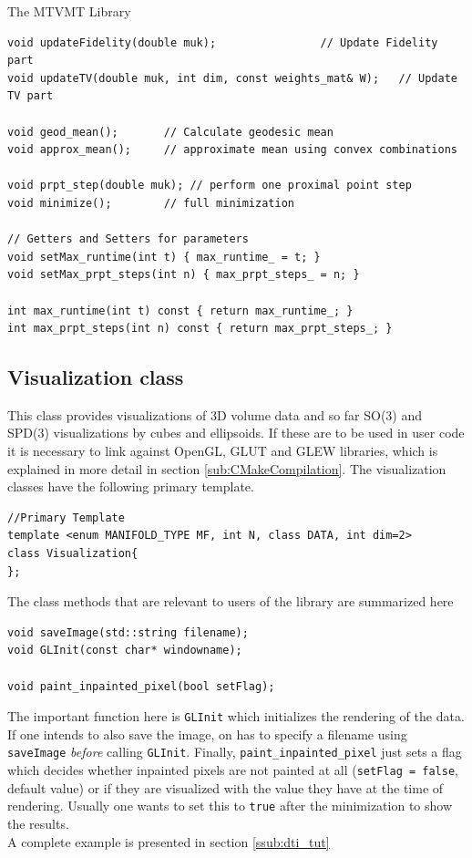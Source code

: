\begin{chapter}{The MTVMT Library}
\begin{lstlisting}
void updateFidelity(double muk);			    // Update Fidelity part
void updateTV(double muk, int dim, const weights_mat& W);   // Update TV part

void geod_mean();	    // Calculate geodesic mean
void approx_mean();	    // approximate mean using convex combinations

void prpt_step(double muk); // perform one proximal point step
void minimize();	    // full minimization

// Getters and Setters for parameters
void setMax_runtime(int t) { max_runtime_ = t; }
void setMax_prpt_steps(int n) { max_prpt_steps_ = n; }
	    
int max_runtime(int t) const { return max_runtime_; }
int max_prpt_steps(int n) const { return max_prpt_steps_; }
\end{lstlisting}



\subsection{Visualization class} %
\label{sub:Visualization class}
This class provides visualizations of 3D volume data and so far SO(3) and SPD(3) visualizations by cubes and ellipsoids. If these are to be used in user code it is necessary to link
against OpenGL, GLUT and GLEW libraries, which is explained in more detail in section \ref{sub:CMakeCompilation}. The visualization classes have the following primary template.
\cppinline
\begin{lstlisting}
//Primary Template
template <enum MANIFOLD_TYPE MF, int N, class DATA, int dim=2>
class Visualization{
};
\end{lstlisting}

The class methods that are relevant to users of the library are summarized here\\
\cppinline
\begin{lstlisting}
void saveImage(std::string filename);
void GLInit(const char* windowname);

void paint_inpainted_pixel(bool setFlag);
\end{lstlisting}

The important function here is \texttt{GLInit} which initializes the rendering of the data. If one intends to also save the image, on has to specify a filename using
\texttt{saveImage} \textit{before} calling \texttt{GLInit}. Finally, \texttt{paint\_inpainted\_pixel} just sets a flag which decides whether inpainted pixels are not painted
at all (\texttt{setFlag = false}, default value) or if they are visualized with the value they have at the time of rendering. Usually one wants to set this to \texttt{true}
after the minimization to show the results.\\
A complete example is presented in section \ref{ssub:dti_tut}\\


\end{chapter}
